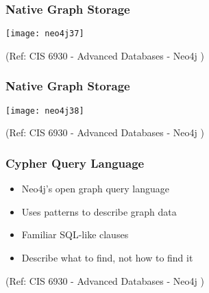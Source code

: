 \begin{frame}\frametitle{Native Graph Storage}

\begin{center}
\texttt{[image: neo4j37]}
\end{center}	  


{\tiny (Ref: CIS 6930 - Advanced Databases - Neo4j )}
\end{frame}

\begin{frame}\frametitle{Native Graph Storage}

\begin{center}
\texttt{[image: neo4j38]}
\end{center}	  


{\tiny (Ref: CIS 6930 - Advanced Databases - Neo4j )}
\end{frame}

\begin{frame}\frametitle{Cypher Query Language}

\begin{itemize}
\item Neo4j’s open graph query language
\item Uses patterns to describe graph data
\item Familiar SQL-like clauses
\item Describe what to find, not how to find it
\end{itemize}

{\tiny (Ref: CIS 6930 - Advanced Databases - Neo4j )}
\end{frame}
